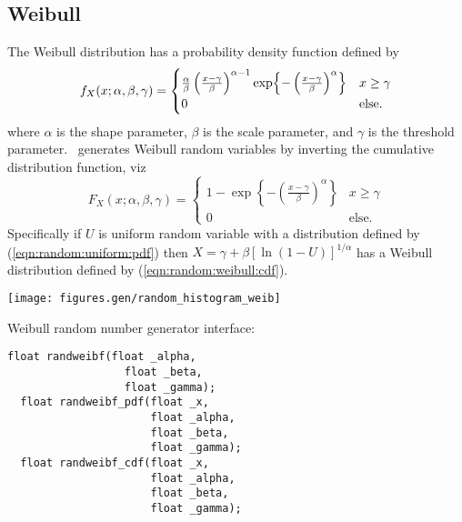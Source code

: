 \subsection{Weibull}
\label{module:random:weibull}
The Weibull distribution has a probability density function defined by
%
\begin{equation}
\label{eqn:random:weibull:pdf}
    f_X(x;\alpha,\beta,\gamma) =
    \begin{cases}
        \frac{\alpha}{\beta}
        \left(
            \frac{x-\gamma}{\beta}
        \right)^{\alpha-1}
        \exp\Bigl\{
            -\left( \frac{x-\gamma}{\beta} \right)^\alpha
        \Bigr\}                         & \text{$x \ge \gamma$} \\
        0                               & \text{else}.
    \end{cases}
\end{equation}
%
where
$\alpha$ is the shape parameter,
$\beta$ is the scale parameter,
and
$\gamma$ is the threshold parameter.
%
\liquid\ generates Weibull random variables by inverting the cumulative
distribution function, viz
%
\begin{equation}
\label{eqn:random:weibull:cdf}
    F_X(x;\alpha,\beta,\gamma) =
    \begin{cases}
        1 - \exp\left\{
            -\left(\frac{x-\gamma}{\beta}\right)^\alpha
        \right\} &                            x \ge \gamma \\
        0 &                                   \text{else}.
    \end{cases}
\end{equation}
%
Specifically if $U$ is uniform random variable with a distribution
defined by (\ref{eqn:random:uniform:pdf}) then
$X = \gamma + \beta\left[ \ln\left(1 - U\right) \right]^{1/\alpha}$
%
has a Weibull distribution defined by (\ref{eqn:random:weibull:cdf}).

\begin{minipage}{0.5\textwidth}
  \texttt{[image: figures.gen/random\_histogram\_weib]}
\end{minipage}
\begin{minipage}{0.5\textwidth}
  Weibull random number generator interface:
  \begin{Verbatim}[fontsize=\small]
  float randweibf(float _alpha,
                  float _beta,
                  float _gamma);
  float randweibf_pdf(float _x,
                      float _alpha,
                      float _beta,
                      float _gamma);
  float randweibf_cdf(float _x,
                      float _alpha,
                      float _beta,
                      float _gamma);
  \end{Verbatim}
\end{minipage}


